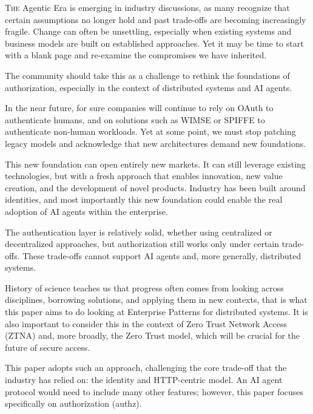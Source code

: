 
\lettrine{T}{he} Agentic Era is emerging in industry discussions, as many recognize that certain assumptions no longer hold and past trade-offs are becoming increasingly fragile.
Change can often be unsettling, especially when existing systems and business models are built on established approaches. 
Yet it may be time to start with a blank page and re-examine the compromises we have inherited.

\vspace{0.5em} The community should take this as a challenge to rethink the foundations of authorization, especially in the context of distributed systems and AI agents.

\vspace{0.5em} In the near future, for sure companies will continue to rely on OAuth to authenticate humans, and on solutions such as WIMSE or SPIFFE to authenticate non-human workloads. Yet at some point, we must stop patching legacy models and acknowledge that new architectures demand new foundations.

\vspace{0.5em} This new foundation can open entirely new markets. 
It can still leverage existing technologies, but with a fresh approach that enables innovation, new value creation, and the development of novel products. 
Industry has been built around identities, and most importantly this new foundation could enable the real adoption of AI agents within the enterprise.

\vspace{0.5em} The authentication layer is relatively solid, whether using centralized or decentralized approaches, but authorization still works only under certain trade-offs. These trade-offs cannot support AI agents and, more generally, distributed systems. 

\vspace{0.5em} History of science teaches us that progress often comes from looking across disciplines, borrowing solutions, and applying them in new contexts, that is what this paper aims to do looking at Enterprise Patterns for distributed systems.
It is also important to consider this in the context of Zero Trust Network Access (ZTNA) and, more broadly, the Zero Trust model, which will be crucial for the future of secure access.

\vspace{0.5em} This paper adopts such an approach, challenging the core trade-off that the industry has relied on: the identity and HTTP-centric model.
An AI agent protocol would need to include many other features; however, this paper focuses specifically on authorization (authz).